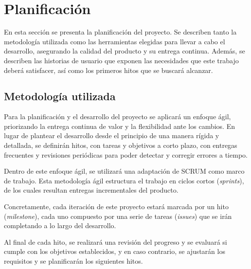 \chapter{Planificación}
En esta sección se presenta la planificación del proyecto. Se describen tanto la
metodología utilizada como las herramientas elegidas para llevar a cabo el desarrollo,
asegurando la calidad del producto y su entrega continua. Además, se describen las historias
de usuario que exponen las necesidades que este trabajo deberá satisfacer, así como los
primeros hitos que se buscará alcanzar.

\section{Metodología utilizada}
Para la planificación y el desarrollo del proyecto se aplicará un enfoque ágil,
priorizando la entrega continua de valor y la flexibilidad ante los cambios.
En lugar de plantear el desarrollo desde el principio de una manera rígida y detallada,
se definirán hitos, con tareas y objetivos a corto plazo, con entregas frecuentes
y revisiones periódicas para poder detectar y corregir errores a tiempo.

Dentro de este enfoque ágil, se utilizará una adaptación de SCRUM como marco
de trabajo. Esta metodología ágil estructura el trabajo en ciclos cortos (\textit{sprints}),
de los cuales resultan entregas incrementales del producto. 

Concretamente, cada iteración de este proyecto estará marcada por un hito (\textit{milestone}),
cada uno compuesto por una serie de tareas (\textit{issues}) que se irán completando a lo largo
del desarrollo.

Al final de cada hito, se realizará una revisión del progreso y se evaluará si cumple con los 
objetivos establecidos, y en caso contrario, se ajustarán los requisitos y se planificarán 
los siguientes hitos.

